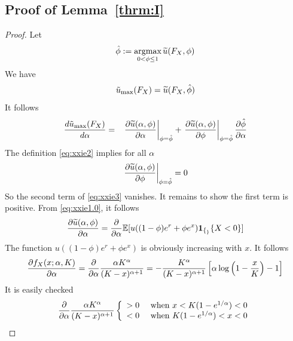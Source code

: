 \begin{subappendices}
\section{Proof of Lemma~\ref{thrm:I}}
\setcounter{equation}{0}
\label{sec:thrmI_proof}
\begin{proof}
  Let
  \begin{equation}
    \label{eq:xxie2}
    \hat \phi := \underset{0 < \phi \leq 1}{\text{argmax}}\,
    \widetilde u(F_X, \phi)
  \end{equation}
  We have
  \[
  \tilde u_{\rm max}(F_X) = \widetilde u(F_X, \hat\phi)
  \]
  It follows
  \begin{eqnarray}
    {d \tilde u_{\rm max}(F_X) \over d \alpha}
    &=&
    \left.{\partial \widetilde u(\alpha, \phi) \over \partial \alpha}\right|_{\phi = \hat\phi}
    + \left.{\partial \widetilde u(\alpha, \phi) \over \partial \phi}\right|_{\phi = \hat\phi}
    {\partial \hat\phi \over \partial \alpha}
    \label{eq:xxie3}
  \end{eqnarray}
  The definition \eqref{eq:xxie2} implies for all $\alpha$
  \begin{equation}
    \label{eq:xxie4}
    \left.{\partial \widetilde u(\alpha, \phi) \over \partial \phi}\right|_{\phi = \hat\phi} = 0
  \end{equation}
  So the second term of \eqref{eq:xxie3} vanishes. It remains to show
  the first term is positive. From \eqref{eq:xxie1.0}, it follows
  \begin{eqnarray*}
    {\partial\widetilde u(\alpha, \phi) \over \partial\alpha}
    = {\partial \over \partial \alpha}\mathbb{E}[u((1 - \phi) e^r + \phi e^x) \mathbf{1}_{\{_\}}{\{X < 0\}}]
  \end{eqnarray*}
  The function $u((1 - \phi) e^r + \phi e^x)$ is obviously
  increasing with $x$. It follows
  \begin{eqnarray*}
    {\partial f_X(x; \alpha, K) \over \partial\alpha}
    = {\partial \over \partial \alpha} {\alpha K^\alpha \over (K - x)^{\alpha + 1}} 
    = - {K^\alpha \over (K - x)^{\alpha + 1}}
    \left[
      \alpha
      \log\left(
        1 - {x \over K}
      \right) - 1
    \right]
  \end{eqnarray*}
  It is easily checked
  \[
  {\partial \over \partial \alpha}
  {\alpha K^\alpha \over (K - x)^{\alpha + 1}}
  \left\{
    \begin{array}{ll}
      > 0 & \text{ when } x < K(1 - e^{1/\alpha}) < 0 \\
      < 0 & \text{ when } K(1 - e^{1/\alpha}) < x < 0
    \end{array}
  \right.
  \]

\end{proof}
\end{subappendices}
